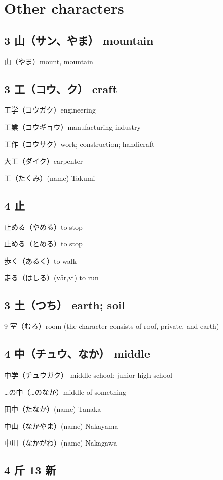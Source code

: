 \chapter{Other characters}

\section{3 山（サン、やま） mountain}

山（やま）mount, mountain

\section{3 工（コウ、ク） craft}

工学（コウガク）engineering

工業（コウギョウ）manufacturing industry

工作（コウサク）work; construction; handicraft

大工（ダイク）carpenter

工（たくみ）(name) Takumi

\section{4 止}

止める（やめる）to stop

止める（とめる）to stop

歩く（あるく）to walk

走る（はしる）(v5r,vi) to run

\section{3 土（つち） earth; soil}

9 室（むろ）room (the character consists of roof, private, and earth)

\section{4 中（チュウ、なか） middle}

中学（チュウガク） middle school; junior high school

…の中（…のなか）middle of something

田中（たなか）(name) Tanaka

中山（なかやま）(name) Nakayama

中川（なかがわ）(name) Nakagawa

\section{4 斤 13 新}

